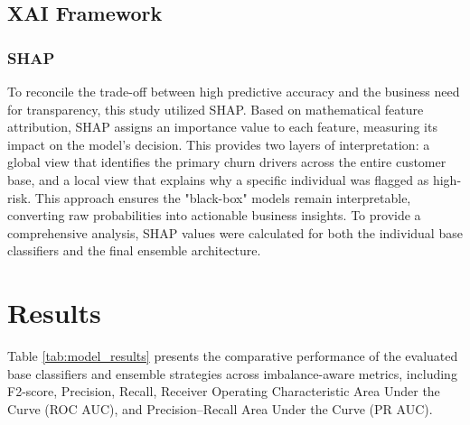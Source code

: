 \documentclass[a4paper,twoside]{article}
\begin{document}
\subsection{XAI Framework}

\subsubsection{SHAP}

To reconcile the trade-off between high predictive accuracy and the business need for transparency, this study utilized SHAP. Based on mathematical feature attribution, SHAP assigns an importance value to each feature, measuring its impact on the model's decision. This provides two layers of interpretation: a global view that identifies the primary churn drivers across the entire customer base, and a local view that explains why a specific individual was flagged as high-risk. This approach ensures the "black-box" models remain interpretable, converting raw probabilities into actionable business insights. To provide a comprehensive analysis, SHAP values were calculated for both the individual base classifiers and the final ensemble architecture.

\section{Results}

Table \ref{tab:model_results} presents the comparative performance of the evaluated base classifiers and ensemble strategies across imbalance-aware metrics, including F2-score, Precision, Recall, Receiver Operating Characteristic Area Under the Curve (ROC AUC), and Precision--Recall Area Under the Curve (PR AUC).
\end{document}
